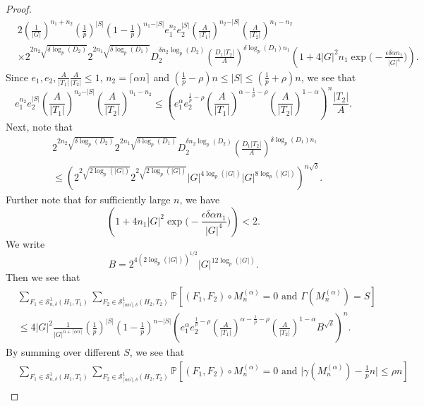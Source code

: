 \documentclass[12pt]{amsart}
\theoremstyle{definition}
\newcommand{\PPP}{\mathbb{P}}
\newcommand{\SSO}[3]{\mathcal{S}^1_{#1}(#2,#3)}
\newcommand{\Mna}{M_{n}^{(\alpha)}}
\newcommand{\abs}[1]{\vert#1\vert}
\newcommand{\ceil}[1]{\lceil#1\rceil}
\begin{document}
\begin{proof}
\begin{align*}
&2 (\tfrac{1}{\abs{G}})^{n_1+n_2}
(\tfrac{1}{p})^{\abs{S}}
 (1-\tfrac{1}{p})^{n_1-\abs{S}}
 e_1^{n_2} e_2^{\abs{S}}
 \left(\frac{A}{\abs{T_1}}\right)^{n_2-\abs{S}}
  \left(\frac{A}{\abs{T_2}}\right)^{n_1-n_2}\\
&\times 2^{2n_2\sqrt{\delta\log_p(D_2)}}
2^{2n_1\sqrt{\delta\log_p(D_1)}}
D_2^{\delta n_2\log_p(D_2)}\left(\frac{D_1\abs{T_2}}{A}\right)^{\delta\log_p(D_1) n_1}
\left(1+4\abs{G}^2n_1 \exp\Big(-\frac{\epsilon \delta \alpha n_1}{|G|^4}\Big) \right).
\end{align*}
Since $e_1,e_2,\frac{A}{\abs{T_1}}\frac{A}{\abs{T_2}}\leq 1$, $n_2=\ceil{\alpha n}$ and $(\frac{1}{p}-\rho)n \leq \abs{S}\leq (\frac{1}{p}+\rho)n$, we see that
\[
 e_1^{n_2} e_2^{\abs{S}}
 \left(\frac{A}{\abs{T_1}}\right)^{n_2-\abs{S}}
  \left(\frac{A}{\abs{T_2}}\right)^{n_1-n_2}
  \leq\left(e_1^{\alpha} e_2^{\frac{1}{p}-\rho} \left(\frac{A}{\abs{T_1}}\right)^{\alpha-\frac{1}{p}-\rho} \left(\frac{A}{\abs{T_2}}\right)^{1-\alpha} \right)^n \frac{\abs{T_2}}{A}.
\]
Next, note that
\begin{align*}
&2^{2n_2\sqrt{\delta\log_p(D_2)}}
2^{2n_1\sqrt{\delta\log_p(D_1)}}
D_2^{\delta n_2\log_p(D_2)}
\left(\frac{D_1\abs{T_2}}{A}\right)^{\delta\log_p(D_1) n_1}\\
&\leq 
\left(
2^{2\sqrt{2\log_p(\abs{G})}}
2^{2\sqrt{2\log_p(\abs{G})}}
\abs{G}^{4\log_p(\abs{G})}
\abs{G}^{8\log_p(\abs{G})}
\right)^{n\sqrt{\delta}}.
\end{align*}
Further note that for sufficiently large $n$, we have
\[
\left(1+4n_1\abs{G}^2\exp\Big(-\frac{\epsilon\delta \alpha n_1}{|G|^4}\Big)\right)
<2.
\]
We write
\[
B=2^{4(2\log_p(\abs{G}))^{1/2}}
\abs{G}^{12\log_p(\abs{G})}.
\]
Then we see that
\begin{align*}
&\sum_{F_1\in \SSO{n,\delta}{H_1}{T_1}}
\sum_{F_2\in \SSO{\ceil{\alpha n},\delta}{H_2}{T_2}}
\PPP[(F_1,F_2)\circ \Mna=0 \text{ and } \Gamma(\Mna)=S]\\
&\leq 4\abs{G}^2
\frac{1}{\abs{G}^{n+\ceil{\alpha n}}}
(\tfrac{1}{p})^{\abs{S}}  
(1-\tfrac{1}{p})^{n-\abs{S}}
\left(
e_1^{\alpha} e_2^{\frac{1}{p}-\rho}
\left(\frac{A}{\abs{T_1}}\right)^{\alpha-\frac{1}{p}-\rho}
\left(\frac{A}{\abs{T_2}}\right)^{1-\alpha}
B^{\sqrt{\delta}}
\right)^n.
\end{align*}
By summing over different $S$, we see that
\begin{align*}
&\sum_{F_1\in \SSO{n,\delta}{H_1}{T_1}}
\sum_{F_2\in \SSO{\ceil{\alpha n},\delta}{H_2}{T_2}}
\PPP[(F_1,F_2)\circ \Mna=0 \text{ and } \abs{\gamma(\Mna)-\tfrac{1}{p}n} \leq \rho n]\\

\end{align*}
\end{proof}
\end{document}
